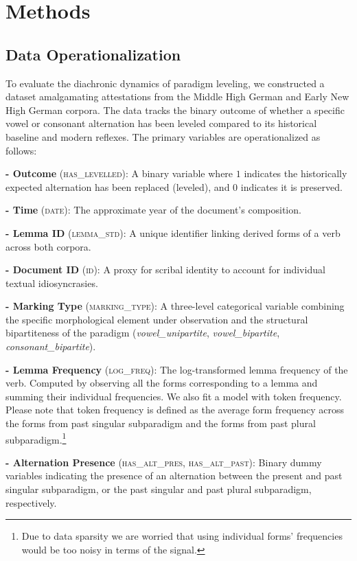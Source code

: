 \section{Methods}

\subsection{Data Operationalization}

To evaluate the diachronic dynamics of paradigm leveling, we constructed a dataset amalgamating attestations from the Middle High German and Early New High German corpora. The data tracks the binary outcome of whether a specific vowel or consonant alternation has been leveled compared to its historical baseline and modern reflexes. The primary variables are operationalized as follows:

\textbf{- Outcome} (\textsc{has\_levelled}): A binary variable where $1$ indicates the historically expected alternation has been replaced (leveled), and $0$ indicates it is preserved.

\textbf{- Time} (\textsc{date}): The approximate year of the document's composition.

\textbf{- Lemma ID} (\textsc{lemma\_std}): A unique identifier linking derived forms of a verb across both corpora.

\textbf{- Document ID} (\textsc{id}): A proxy for scribal identity to account for individual textual idiosyncrasies.

\textbf{- Marking Type} (\textsc{marking\_type}): A three-level categorical variable combining the specific morphological element under observation and the structural bipartiteness of the paradigm (\textit{vowel\_unipartite}, \textit{vowel\_bipartite}, \textit{consonant\_bipartite}).

\textbf{- Lemma Frequency} (\textsc{log\_freq}): The log-transformed lemma frequency of the verb. Computed by observing all the forms corresponding to a lemma and summing their individual frequencies. We also fit a model with token frequency. Please note that token frequency is defined as the average form frequency across the forms from past singular subparadigm and the forms from past plural subparadigm.\footnote{Due to data sparsity we are worried that using individual forms' frequencies would be too noisy in terms of the signal.} 

\textbf{- Alternation Presence} (\textsc{has\_alt\_pres}, \textsc{has\_alt\_past}): Binary dummy variables indicating the presence of an alternation between the present and past singular subparadigm, or the past singular and past plural subparadigm, respectively.

